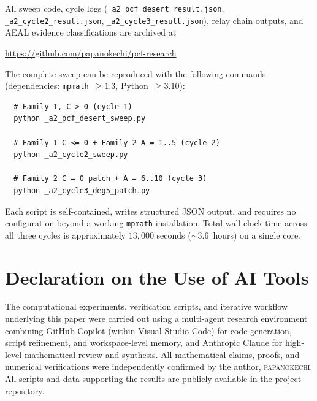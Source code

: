 \documentclass[11pt]{amsart}
\theoremstyle{plain}
\theoremstyle{remark}
\begin{document}
All sweep code, cycle logs
(\texttt{\_a2\_pcf\_desert\_result.json},
\texttt{\_a2\_cycle2\_result.json},
\texttt{\_a2\_cycle3\_result.json}),
relay chain outputs, and AEAL evidence classifications
are archived at
\begin{center}
  \url{https://github.com/papanokechi/pcf-research}
\end{center}

The complete sweep can be reproduced with the following commands
(dependencies: \texttt{mpmath}~$\geq 1.3$, Python~$\geq 3.10$):
\begin{verbatim}
  # Family 1, C > 0 (cycle 1)
  python _a2_pcf_desert_sweep.py

  # Family 1 C <= 0 + Family 2 A = 1..5 (cycle 2)
  python _a2_cycle2_sweep.py

  # Family 2 C = 0 patch + A = 6..10 (cycle 3)
  python _a2_cycle3_deg5_patch.py
\end{verbatim}
Each script is self-contained, writes structured JSON output, and
requires no configuration beyond a working \texttt{mpmath}
installation.
Total wall-clock time across all three cycles is approximately
$13{,}000$ seconds (${\sim}3.6$~hours) on a single core.

\section*{Declaration on the Use of AI Tools}

The computational experiments, verification scripts, and iterative
workflow underlying this paper were carried out using a multi-agent
research environment combining GitHub Copilot (within Visual Studio
Code) for code generation, script refinement, and workspace-level
memory, and Anthropic Claude for high-level mathematical review and
synthesis.  All mathematical claims, proofs, and numerical
verifications were independently confirmed by the author,
\textsc{papanokechi}.  All scripts and data supporting the results
are publicly available in the project repository.
\end{document}
